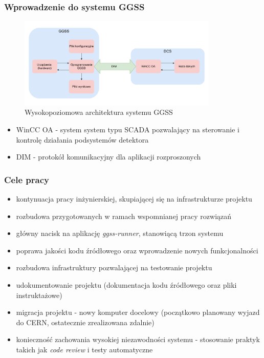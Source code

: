 \documentclass[10pt]{beamer}
\begin{document}
\begin{frame}
\frametitle{Wprowadzenie do systemu GGSS}
\begin{figure}
\includegraphics[width=0.85\textwidth]{static/high_level_architecture.pdf}
\caption{Wysokopoziomowa architektura systemu GGSS}
\end{figure}
\begin{itemize}
    \item WinCC OA - system system typu SCADA pozwalający na sterowanie i kontrolę działania podsystemów detektora
    \item DIM - protokół komunikacyjny dla aplikacji rozproszonych
\end{itemize}
\end{frame}

\begin{frame}
\frametitle{Cele pracy}
\begin{itemize}
    \item kontynuacja pracy inżynierskiej, skupiającej się na infrastrukturze projektu
    \item rozbudowa przygotowanych w ramach wspomnianej pracy rozwiązań
    \item główny nacisk na aplikację \emph{ggss-runner}, stanowiącą trzon systemu
    \item poprawa jakości kodu źródłowego oraz wprowadzenie nowych funkcjonalności
    \item rozbudowa infrastruktury pozwalającej na testowanie projektu
    \item udokumentowanie projektu (dokumentacja kodu źródłowego oraz pliki instruktażowe)
    \item migracja projektu - nowy komputer docelowy (początkowo planowany wyjazd do CERN, ostatecznie zrealizowana zdalnie)
    \item konieczność zachowania wysokiej niezawodności systemu - stosowanie praktyk takich jak \emph{code review} i testy automatyczne
\end{itemize}
\end{frame}
\end{document}
